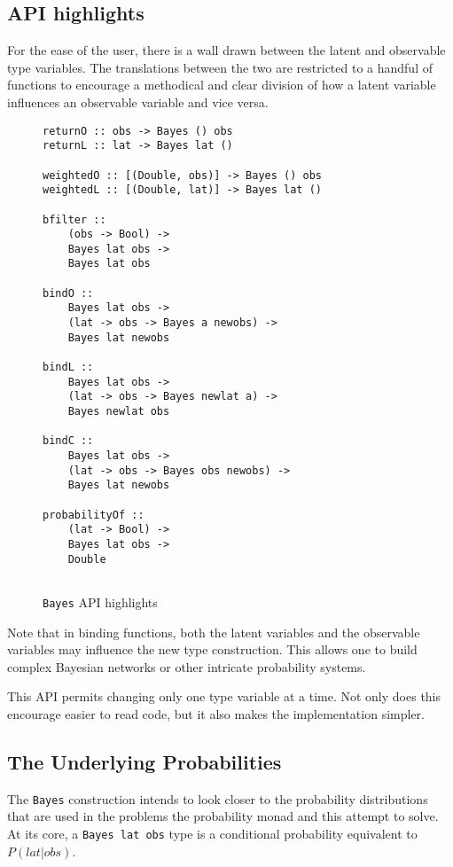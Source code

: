 \documentclass[9pt,twocolumn]{article}
\begin{document}
\subsection{API highlights}
For the ease of the user, there is a wall drawn between the latent and observable type variables. The translations between the two are restricted to a handful of functions to encourage a methodical and clear division of how a latent variable influences an observable variable and vice versa.

\begin{figure}
\begin{verbatim}
returnO :: obs -> Bayes () obs
returnL :: lat -> Bayes lat ()

weightedO :: [(Double, obs)] -> Bayes () obs
weightedL :: [(Double, lat)] -> Bayes lat ()

bfilter ::
    (obs -> Bool) ->
    Bayes lat obs ->
    Bayes lat obs

bindO ::
    Bayes lat obs ->
    (lat -> obs -> Bayes a newobs) ->
    Bayes lat newobs

bindL ::
    Bayes lat obs ->
    (lat -> obs -> Bayes newlat a) ->
    Bayes newlat obs

bindC ::
    Bayes lat obs ->
    (lat -> obs -> Bayes obs newobs) ->
    Bayes lat newobs

probabilityOf ::
    (lat -> Bool) ->
    Bayes lat obs ->
    Double
    
\end{verbatim}
\caption{\texttt{Bayes} API highlights}
\end{figure}
Note that in binding functions, both the latent variables and the observable variables may influence the new type construction. This allows one to build complex Bayesian networks or other intricate probability systems.

This API permits changing only one type variable at a time. Not only does this encourage easier to read code, but it also makes the implementation simpler.

\subsection{The Underlying Probabilities}
The \texttt{Bayes} construction intends to look closer to the probability distributions that are used in the problems the probability monad and this attempt to solve. At its core, a \texttt{Bayes lat obs} type is a conditional probability equivalent to $P(lat | obs)$.
\end{document}
